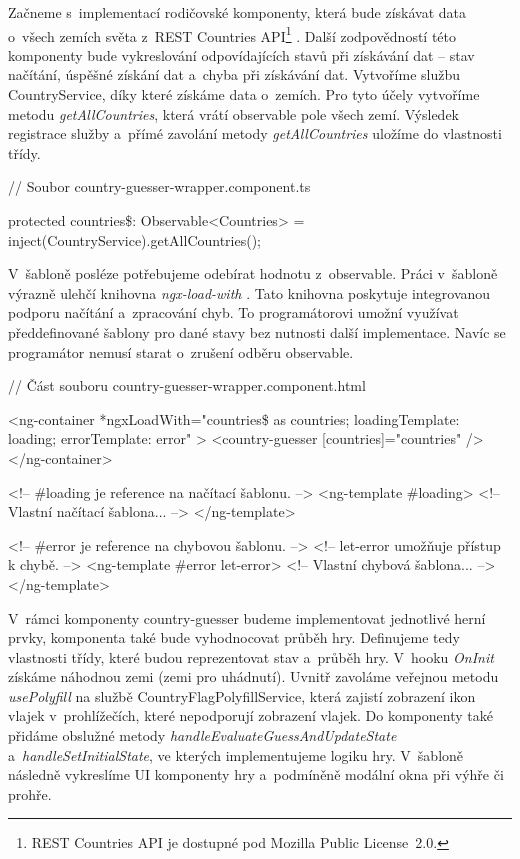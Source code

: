 Začneme s~implementací rodičovské komponenty, která bude získávat data o~všech zemích světa z~REST Countries API\footnote{REST Countries API je dostupné pod Mozilla Public License~2.0.\cite{restcountriesapi}} \cite{restcountriesapi}. 
Další zodpovědností této komponenty bude vykreslování odpovídajících stavů při získávání dat -- stav načítání, úspěšné získání dat a~chyba při získávání dat. 
Vytvoříme službu CountryService, díky které získáme data o~zemích. Pro tyto účely vytvoříme metodu \emph{getAllCountries}, která vrátí observable pole všech zemí. 
Výsledek registrace služby a~přímé zavolání metody \emph{getAllCountries} uložíme do vlastnosti třídy.

\begin{prog}
// Soubor country-guesser-wrapper.component.ts

protected countries\$: Observable<Countries> 
  = inject(CountryService).getAllCountries();
\end{prog}

V~šabloně posléze potřebujeme odebírat hodnotu z~observable. Práci v~šabloně výrazně ulehčí knihovna \emph{ngx-load-with} \cite{ngxloadwith}. 
Tato knihovna poskytuje integrovanou podporu načítání a~zpracování chyb. To programátorovi umožní využívat předdefinované šablony pro dané stavy bez nutnosti další implementace. 
Navíc se programátor nemusí starat o~zrušení odběru observable.

\begin{prog}
// Část souboru country-guesser-wrapper.component.html

<ng-container
  *ngxLoadWith="countries\$ as countries; 
  loadingTemplate: loading; errorTemplate: error"
>
  <country-guesser [countries]="countries" />
</ng-container>

<!-- \#loading je reference na načítací šablonu. -->
<ng-template \#loading>
  <!-- Vlastní načítací šablona... -->
</ng-template>

<!-- \#error je reference na chybovou šablonu. -->
<!-- let-error umožňuje přístup k chybě. -->
<ng-template \#error let-error>
  <!-- Vlastní chybová šablona... -->
</ng-template>
\end{prog}

V~rámci komponenty country-guesser budeme implementovat jednotlivé herní prvky, komponenta také bude vyhodnocovat průběh hry. 
Definujeme tedy vlastnosti třídy, které budou reprezentovat stav a~průběh hry. V~hooku \emph{OnInit} získáme náhodnou zemi (zemi pro uhádnutí). 
Uvnitř zavoláme veřejnou metodu \emph{usePolyfill} na službě CountryFlagPolyfillService, která zajistí zobrazení ikon vlajek v~prohlížečích, které nepodporují zobrazení vlajek.
Do komponenty také přidáme obslužné metody \emph{handleEvaluateGuessAndUpdateState} a~\emph{handleSetInitialState}, ve kterých implementujeme logiku hry. 
V~šabloně následně vykreslíme UI komponenty hry a~podmíněně modální okna při výhře či prohře.

